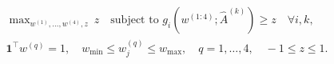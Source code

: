 \documentclass[border=3pt]{standalone}
\begin{document}
$\displaystyle\begin{gathered}
\max_{w^{(1)},\ldots,w^{(4)},z}\ z
\quad\text{subject to } g_i\!\left(w^{(1:4)};\widehat A^{(k)}\right)\ge z\quad\forall i,k,\\[4pt]
\mathbf1^\top w^{(q)}=1,\quad w_{\min}\le w_j^{(q)}\le w_{\max},\quad q=1,\ldots,4,\quad -1\le z\le1.
\end{gathered}$
\end{document}
